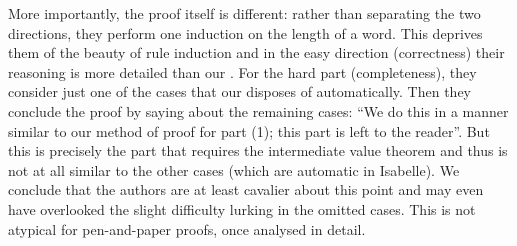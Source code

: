 \begin{isabellebody}
\begin{isamarkuptext}
More importantly, the proof itself is different: rather than separating the
two directions, they perform one induction on the length of a word. This
deprives them of the beauty of rule induction and in the easy direction
(correctness) their reasoning is more detailed than our . For the
hard part (completeness), they consider just one of the cases that our  disposes of automatically. Then they conclude the proof by saying
about the remaining cases: ``We do this in a manner similar to our method of
proof for part (1); this part is left to the reader''. But this is precisely
the part that requires the intermediate value theorem and thus is not at all
similar to the other cases (which are automatic in Isabelle). We conclude
that the authors are at least cavalier about this point and may even have
overlooked the slight difficulty lurking in the omitted cases. This is not
atypical for pen-and-paper proofs, once analysed in detail.%
\end{isamarkuptext}%
\end{isabellebody}%

